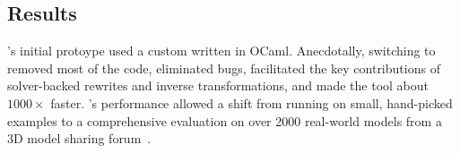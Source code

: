 \subsection{Results}
\sz's initial protoype used a custom \egraph written in OCaml.
Anecdotally, switching to \egg
  removed most of the code,
  eliminated bugs,
  facilitated the key contributions of solver-backed rewrites and inverse transformations,
  and made the tool about $1000 \times$ faster.
\egg's performance allowed a shift from running on small, hand-picked
  examples to a comprehensive evaluation on over 2000 real-world models from
  a 3D model sharing forum~\cite{szalinski}.

